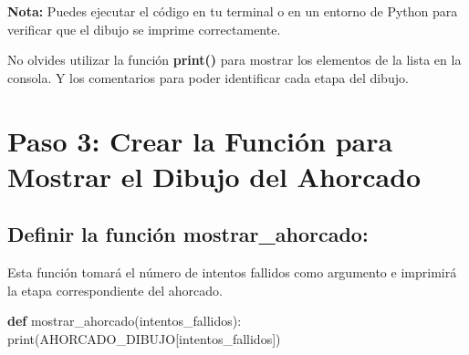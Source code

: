 \documentclass[
  a4paper,
  DIV=11,
  numbers=noendperiod,
  onepage,
  openany]{scrreprt}
\newenvironment{Shaded}{\begin{snugshade}}{\end{snugshade}}
\newcommand{\BuiltInTok}[1]{\textcolor[rgb]{0.00,0.23,0.31}{#1}}
\newcommand{\KeywordTok}[1]{\textcolor[rgb]{0.00,0.23,0.31}{\textbf{#1}}}
\newcommand{\NormalTok}[1]{\textcolor[rgb]{0.00,0.23,0.31}{#1}}
\begin{document}
\begin{tcolorbox}[enhanced jigsaw, breakable, colframe=quarto-callout-tip-color-frame, toprule=.15mm, left=2mm, leftrule=.75mm, opacityback=0, coltitle=black, opacitybacktitle=0.6, bottomtitle=1mm, colback=white, bottomrule=.15mm, title=\textcolor{quarto-callout-tip-color}{\faLightbulb}\hspace{0.5em}{Tip}, rightrule=.15mm, colbacktitle=quarto-callout-tip-color!10!white, titlerule=0mm, arc=.35mm, toptitle=1mm]

\textbf{Nota:} Puedes ejecutar el código en tu terminal o en un entorno
de Python para verificar que el dibujo se imprime correctamente.

\end{tcolorbox}

\begin{tcolorbox}[enhanced jigsaw, breakable, colframe=quarto-callout-tip-color-frame, toprule=.15mm, left=2mm, leftrule=.75mm, opacityback=0, coltitle=black, opacitybacktitle=0.6, bottomtitle=1mm, colback=white, bottomrule=.15mm, title=\textcolor{quarto-callout-tip-color}{\faLightbulb}\hspace{0.5em}{Tip}, rightrule=.15mm, colbacktitle=quarto-callout-tip-color!10!white, titlerule=0mm, arc=.35mm, toptitle=1mm]

No olvides utilizar la función \textbf{print()} para mostrar los
elementos de la lista en la consola. Y los comentarios para poder
identificar cada etapa del dibujo.

\end{tcolorbox}

\section{Paso 3: Crear la Función para Mostrar el Dibujo del
Ahorcado}\label{paso-3-crear-la-funciuxf3n-para-mostrar-el-dibujo-del-ahorcado}

\subsection{Definir la función
mostrar\_ahorcado:}\label{definir-la-funciuxf3n-mostrar_ahorcado}

Esta función tomará el número de intentos fallidos como argumento e
imprimirá la etapa correspondiente del ahorcado.

\begin{Shaded}
\begin{Highlighting}[]
\KeywordTok{def}\NormalTok{ mostrar\_ahorcado(intentos\_fallidos):}
    \BuiltInTok{print}\NormalTok{(AHORCADO\_DIBUJO[intentos\_fallidos])}
\end{Highlighting}
\end{Shaded}
\end{document}
